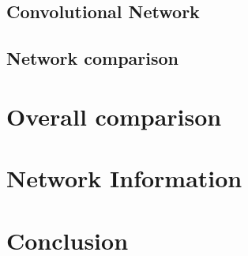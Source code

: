 \subsection{Convolutional Network}

\subsection{Network comparison}

\section{Overall comparison}

\section{Network Information}

\section{Conclusion}
